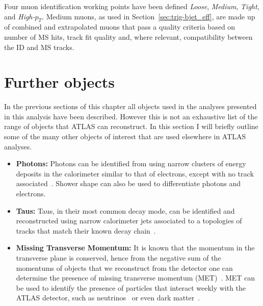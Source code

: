 Four muon identification working points have been defined \textit{Loose}, \textit{Medium}, \textit{Tight}, and \textit{High-$p_T$}.
Medium muons, as used in Section~\ref{sec:trig-bjet_eff}, are made up of combined and extrapolated muons that pass a quality criteria based on
number of MS hits, track fit quality and, where relevant, compatibility between the ID and MS tracks.

\section{Further objects}
\label{sec:obj-further}

In the previous sections of this chapter all objects used in the analyses presented in this analysis have been described.
However this is not an exhaustive list of the range of objects that ATLAS can reconstruct.
In this section I will briefly outline some of the many other objects of interest that are used elsewhere in ATLAS analyses.

\begin{itemize}[leftmargin=*]
\item\textbf{Photons:}
  Photons can be identified from using narrow clusters of energy deposits in the calorimeter similar to that of electrons,
  except with no track associated~\cite{obj-photons}.
  Shower shape can also be used to differentiate photons and electrons.\vspace{0.5em}
\item\textbf{Taus:}
  Taus, in their most common decay mode, can be identified and reconstructed using narrow calorimeter jets
  associated to a topologies of tracks that match their known decay chain~\cite{obj-taus}.\vspace{0.5em}
\item\textbf{Missing Transverse Momentum:}
  It is known that the momentum in the transverse plane is conserved,
  hence from the negative sum of the momentums of objects that we reconstruct from the detector
  one can determine the presence of missing transverse momentum (MET)~\cite{obj-met}.
  MET can be used to identify the presence of particles that interact weekly with the ATLAS detector,
  such as neutrinos~\cite{obj-Hbb} or even dark matter~\cite{obj-met_monoJet}.
\end{itemize}
